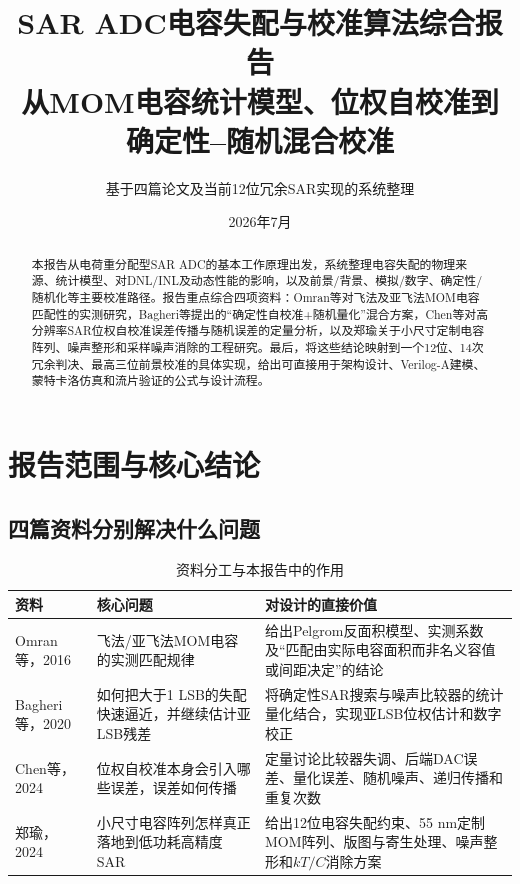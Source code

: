 \documentclass[UTF8,a4paper,11pt]{ctexart}
\title{\textbf{SAR ADC电容失配与校准算法综合报告}\\[6pt]
\large 从MOM电容统计模型、位权自校准到确定性--随机混合校准}
\author{基于四篇论文及当前12位冗余SAR实现的系统整理}
\date{2026年7月}
\begin{document}
\maketitle

\begin{abstract}
本报告从电荷重分配型SAR ADC的基本工作原理出发，系统整理电容失配的物理来源、统计模型、对DNL/INL及动态性能的影响，以及前景/背景、模拟/数字、确定性/随机化等主要校准路径。报告重点综合四项资料：Omran等对飞法及亚飞法MOM电容匹配性的实测研究，Bagheri等提出的“确定性自校准+随机量化”混合方案，Chen等对高分辨率SAR位权自校准误差传播与随机误差的定量分析，以及郑瑜关于小尺寸定制电容阵列、噪声整形和采样噪声消除的工程研究。最后，将这些结论映射到一个12位、14次冗余判决、最高三位前景校准的具体实现，给出可直接用于架构设计、Verilog-A建模、蒙特卡洛仿真和流片验证的公式与设计流程。
\end{abstract}

\tableofcontents
\clearpage

\section{报告范围与核心结论}

\subsection{四篇资料分别解决什么问题}

\begin{table}[H]
\centering
\caption{资料分工与本报告中的作用}
\label{tab:sources}
\begin{tabularx}{\textwidth}{p{2.5cm}p{3.4cm}X}
\toprule
资料 & 核心问题 & 对设计的直接价值\\
\midrule
Omran等，2016 & 飞法/亚飞法MOM电容的实测匹配规律 & 给出Pelgrom反面积模型、实测系数及“匹配由实际电容面积而非名义容值或间距决定”的结论\\
Bagheri等，2020 & 如何把大于1 LSB的失配快速逼近，并继续估计亚LSB残差 & 将确定性SAR搜索与噪声比较器的统计量化结合，实现亚LSB位权估计和数字校正\\
Chen等，2024 & 位权自校准本身会引入哪些误差，误差如何传播 & 定量讨论比较器失调、后端DAC误差、量化误差、随机噪声、递归传播和重复次数\\
郑瑜，2024 & 小尺寸电容阵列怎样真正落地到低功耗高精度SAR & 给出12位电容失配约束、55 nm定制MOM阵列、版图与寄生处理、噪声整形和$kT/C$消除方案\\
\bottomrule
\end{tabularx}
\end{table}
\end{document}
